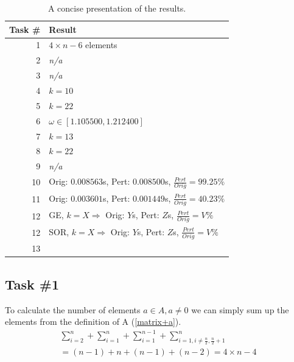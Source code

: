 \documentclass[10pt, a4paper]{article}
\begin{document}
\begin{table}[h]
\begin{center}
\begin{tabular}{r | l}
Task \# & Result \\ \hline
1		& $4\times n-6$ elements                                                     \\
2		& \emph{n/a}                                                                 \\
3		& \emph{n/a}                                                                 \\
4		& $k=10$                                                                     \\
5		& $k=22$	                                                             \\
6		& $\omega\in[1.105500, 1.212400]$                                            \\
7		& $k=13$                                                                     \\
8		& $k=22$                                                                     \\
9		& \emph{n/a}                                                                 \\
10		& Orig: $0.008563$s, Pert: $0.008500$s, $\frac{Pert}{Orig}=99.25\%$ 	     \\
11		& Orig: $0.003601$s, Pert: $0.001449$s, $\frac{Pert}{Orig}=40.23\%$ 	     \\
12		& GE, $k=X \Rightarrow$ Orig: $Y$s, Pert: $Z$s, $\frac{Pert}{Orig}=V\%$      \\ %
12		& SOR, $k=X \Rightarrow$ Orig: $Y$s, Pert: $Z$s, $\frac{Pert}{Orig}=V\%$     \\ %
13		& %
\end{tabular}
\caption{A concise presentation of the results.}
\end{center}
\label{table+result}
\end{table}

\subsection{Task \#1}
To calculate the number of elements $a\in A, a\neq0$ we can simply sum up the elements from the definition of A (\ref{matrix+a}).
\begin{eqnarray}
		\sum_{i=2}^n + \sum_{i=1}^n+\sum_{i=1}^{n-1}+\sum_{i=1,i\neq \frac{n}{2},\frac{n}{2}+1}^n \\
		= (n-1)+n+(n-1)+(n-2)=4\times n -4
\end{eqnarray}
\end{document}
